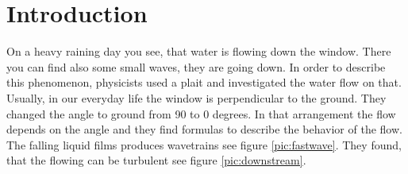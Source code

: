 \documentclass[10pt,fleqn, %
reqno,a4paper]{article}
\begin{document}

\tableofcontents
\newpage

\nwdocspar

\section{Introduction}
On a heavy raining day you see, that water is flowing down the window.
There you can find also some small waves, they are going down. 
In order to describe this phenomenon, physicists used a plait and investigated the water flow on that.
Usually, in our everyday life the window is perpendicular to the ground.
They changed the angle to ground from 90 to 0 degrees. 
In that arrangement the flow depends on the angle and they find formulas to describe the behavior of the flow.  
The falling liquid films produces wavetrains see figure \ref{pic:fastwave}.
They found, that the flowing can be turbulent see figure \ref{pic:downstream}.   
\end{document}
